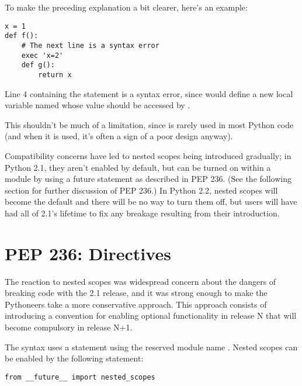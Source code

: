 \documentclass{howto}
\begin{document}
To make the preceding explanation a bit clearer, here's an example:

\begin{verbatim}
x = 1
def f():
    # The next line is a syntax error
    exec 'x=2'  
    def g():
        return x
\end{verbatim}

Line 4 containing the  statement is a syntax error,
since  would define a new local variable named 
whose value should be accessed by .  

This shouldn't be much of a limitation, since  is rarely
used in most Python code (and when it is used, it's often a sign of a
poor design anyway).

Compatibility concerns have led to nested scopes being introduced
gradually; in Python 2.1, they aren't enabled by default, but can be
turned on within a module by using a future statement as described in
PEP 236.  (See the following section for further discussion of PEP
236.)  In Python 2.2, nested scopes will become the default and there
will be no way to turn them off, but users will have had all of 2.1's
lifetime to fix any breakage resulting from their introduction.

\begin{seealso}


\end{seealso}


\section{PEP 236:  Directives}

The reaction to nested scopes was widespread concern about the dangers
of breaking code with the 2.1 release, and it was strong enough to
make the Pythoneers take a more conservative approach.  This approach
consists of introducing a convention for enabling optional
functionality in release N that will become compulsory in release N+1.  

The syntax uses a  statement using the reserved
module name .  Nested scopes can be enabled by the
following statement:

\begin{verbatim}
from __future__ import nested_scopes
\end{verbatim}
\end{document}
